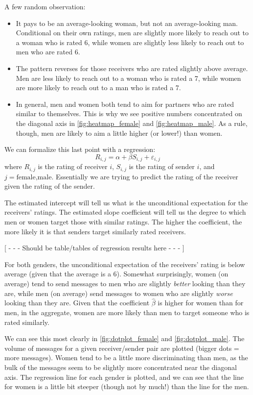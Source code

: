 A few random observation:
\begin{itemize}
\item It pays to be an average-looking woman, but not an average-looking man. Conditional on their own ratings, men are slightly more likely to reach out to a woman who is rated  6, while women are slightly less likely to reach out to men who are rated 6. 
\item The pattern reverses for those receivers who are rated slightly above average. Men are less likely to reach out to a woman who is rated a 7, while women are more likely to reach out to a man who is rated a 7.
\item In general, men and women both tend to aim for partners who are rated similar to themselves. This is why we see positive numbers concentrated on the diagonal axis in \cref{fig:heatmap_female} and \cref{fig:heatmap_male}. As a rule, though, men are likely to aim a little higher (or lower!) than women. 
\end{itemize}

We can formalize this last point with a regression:
\[ R_{i,j} = \alpha + \beta S_{i,j} + \varepsilon_{i,j} \]
where $R_{i,j}$ is the rating of receiver $i$, $S_{i,j}$ is the rating of sender $i$, and $j=\text{female,male}$. Essentially we are trying to predict the rating of the receiver given the rating of the sender.

The estimated intercept will tell us what is the unconditional expectation for the receivers' ratings. The estimated slope coefficient will tell us the degree to which men or women target those with similar ratings. The higher the coefficient, the more likely it is that senders target similarly rated receivers.

[ - - - Should be table/tables of regression results here - - - ] 

For both genders, the unconditional expectation of the receivers' rating is below average (given that the average is a 6). Somewhat surprisingly, women (on average) tend to send messages to men who are slightly \textit{better} looking than they are, while men (on average) send messages to women who are slightly \textit{worse} looking than they are. Given that the coefficient $\hat{\beta}$ is higher for women than for men, in the aggregate, women are more likely than men to target someone who is rated similarly.

We can see this most clearly in \cref{fig:dotplot_female} and \cref{fig:dotplot_male}. The volume of messages for a given receiver/sender pair are plotted (bigger dots = more messages). Women tend to be a little more discriminating than men, as the bulk of the messages seem to be slightly more concentrated near the diagonal axis. The regression line for each gender is plotted, and we can see that the line for women is a little bit steeper (though not by much!) than the line for the men.

